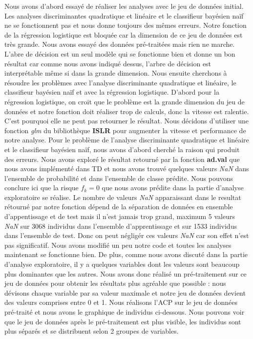 \documentclass[a4paper,11pt,oneside,roman]{article}
\begin{document}
Nous avons d'abord essayé de réaliser les analyses avec le jeu de données initial. Les analyses discriminantes quadratique et linéaire et le classifieur bayésien naïf ne se fonctionnent pas et nous donne toujours des mêmes erreurs. Notre fonction de la régression logistique est bloquée car la dimension de ce jeu de données est très grande. Nous avons essayé des données pré-traitées mais rien ne marche. L'abre de décision est un seul modèle qui se fonctionne bien et donne un bon résultat car comme nous avons indiqué dessus, l'arbre de décision est interprétable même si dans la grande dimension. Nous ensuite cherchons à résoudre les problèmes avec l'analyse discriminante quadratique et linéaire, le classifieur bayésien naïf et avec la régression logistique. D'abord pour la régression logistique, on croit que le problème est la grande dimension du jeu de données et notre fonction doit réaliser trop de calculs, donc la vitesse est ralentie. C'est pourquoi elle ne peut pas retourner le résultat. Nous décidons d'utiliser une fonction \textit{glm} du bibliothèque \textbf{ISLR} pour augmenter la vitesse et performance de notre analyse. Pour le problème de l'analyse discriminante quadratique et linéaire et le classifieur bayésien naïf, nous avons d'abord cherché la raison qui produit des erreurs. Nous avons exploré le résultat retourné par la fonction \textbf{ad.val} que nous avons implémenté dans TD et nous avons trouvé quelques valeurs \textit{NaN} dans l'ensemble de probabilité et dans l'ensemble de classe prédite. Nous pouvons conclure ici que la risque $f_k = 0$ que nous avons prédite dans la partie d'analyse exploratoire se réalise. Le nombre de valeurs \textit{NaN} apparaissant dans le resultat rétourné par notre fonction dépend de la séparation de données en ensemble d'appentissage et de test mais il n'est jamais trop grand, maximum 5 valeurs \textit{NaN} sur 3068 individus dans l'ensemble d'apprentissage et sur 1533 individus dans l'ensemble de test. Donc on peut négligér ces valeurs \textit{NaN} car son effet n'est pas significatif. Nous avons modifié un peu notre code et toutes les analyses maintenant se fonctionne bien. De plus, comme nous avons discuté dans la partie d'analyse exploratoire, il y a quelques variables dont les valeurs sont beaucoup plus dominantes que les autres. Nous avons donc réalisé un pré-traitement sur ce jeu de données pour obtenir les résultats plus agréable que possible : nous dévisons chaque variable par sa valeur maximale et notre jeu de données devient des valeurs comprises entre 0 et 1. Nous réalisons l'ACP sur le jeu de données pré-traité et nous avons le graphique de individus ci-dessous. Nous pouvons voir que le jeu de données après le pré-traitement est plus visible, les individus sont plus séparés et se distribuent selon 2 groupes de variables.\newline
\end{document}
